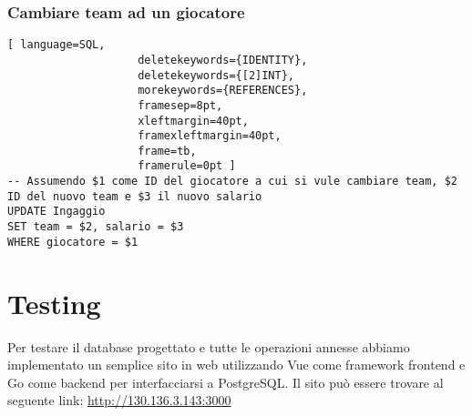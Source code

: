 \documentclass{article}
\begin{document}
\subsubsection{Cambiare team ad un giocatore}
\begin{lstlisting}[ language=SQL,
                    deletekeywords={IDENTITY},
                    deletekeywords={[2]INT},
                    morekeywords={REFERENCES},
                    framesep=8pt,
                    xleftmargin=40pt,
                    framexleftmargin=40pt,
                    frame=tb,
                    framerule=0pt ]
-- Assumendo $1 come ID del giocatore a cui si vule cambiare team, $2 ID del nuovo team e $3 il nuovo salario
UPDATE Ingaggio
SET team = $2, salario = $3
WHERE giocatore = $1
\end{lstlisting}

\section{Testing}
Per testare il database progettato e tutte le operazioni annesse abbiamo implementato un semplice sito in web utilizzando Vue come framework frontend e Go come backend per interfacciarsi a PostgreSQL. Il sito può essere trovare al seguente link: \url{http://130.136.3.143:3000}
\end{document}
